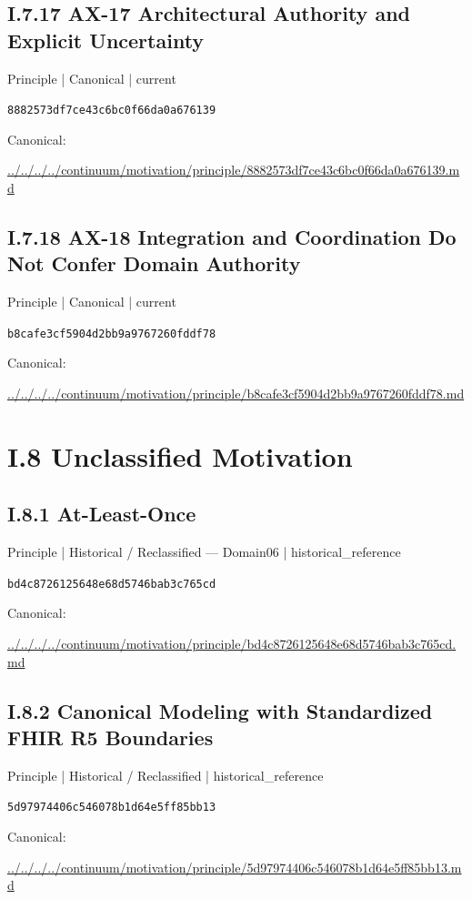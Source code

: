 \documentclass[10pt,a4paper]{article}
\begin{document}
\subsection*{I.7.17 AX-17 Architectural Authority and Explicit Uncertainty}
\label{element-8882573df7ce43c6bc0f66da0a676139}
{\small Principle | Canonical | current}\par
\texttt{8882573df7ce43c6bc0f66da0a676139}\par
Canonical: \par
{\footnotesize\url{../../../../continuum/motivation/principle/8882573df7ce43c6bc0f66da0a676139.md}}\par
\subsection*{I.7.18 AX-18 Integration and Coordination Do Not Confer Domain Authority}
\label{element-b8cafe3cf5904d2bb9a9767260fddf78}
{\small Principle | Canonical | current}\par
\texttt{b8cafe3cf5904d2bb9a9767260fddf78}\par
Canonical: \par
{\footnotesize\url{../../../../continuum/motivation/principle/b8cafe3cf5904d2bb9a9767260fddf78.md}}\par
\section*{I.8 Unclassified Motivation}
\subsection*{I.8.1 At-Least-Once}
\label{element-bd4c8726125648e68d5746bab3c765cd}
{\small Principle | Historical / Reclassified — Domain06 | historical\_reference}\par
\texttt{bd4c8726125648e68d5746bab3c765cd}\par
Canonical: \par
{\footnotesize\url{../../../../continuum/motivation/principle/bd4c8726125648e68d5746bab3c765cd.md}}\par
\subsection*{I.8.2 Canonical Modeling with Standardized FHIR R5 Boundaries}
\label{element-5d97974406c546078b1d64e5ff85bb13}
{\small Principle | Historical / Reclassified | historical\_reference}\par
\texttt{5d97974406c546078b1d64e5ff85bb13}\par
Canonical: \par
{\footnotesize\url{../../../../continuum/motivation/principle/5d97974406c546078b1d64e5ff85bb13.md}}\par
\end{document}
